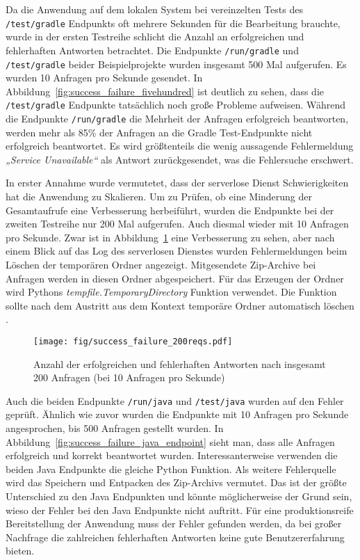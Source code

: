 Da die Anwendung auf dem lokalen System bei vereinzelten Tests des \texttt{/test/gradle} Endpunkts oft
mehrere Sekunden für die Bearbeitung brauchte, wurde in der ersten
Testreihe schlicht die Anzahl an erfolgreichen und fehlerhaften Antworten betrachtet.
Die Endpunkte \texttt{/run/gradle} und \texttt{/test/gradle} beider Beispielprojekte
wurden insgesamt 500 Mal aufgerufen. Es wurden 10 Anfragen pro Sekunde gesendet.
In Abbildung~\ref{fig:success_failure_fivehundred} ist deutlich zu sehen,
dass die \texttt{/test/gradle} Endpunkte tatsächlich noch große Probleme
aufweisen. Während die Endpunkte \texttt{/run/gradle} die Mehrheit der Anfragen erfolgreich
beantworten, werden mehr als 85\% der Anfragen an die Gradle Test-Endpunkte nicht
erfolgreich beantwortet. Es wird größtenteils die wenig aussagende Fehlermeldung \emph{„Service Unavailable“}
als Antwort zurückgesendet, was die Fehlersuche erschwert.

In erster Annahme wurde vermutetet, dass der serverlose Dienst Schwierigkeiten hat die
Anwendung zu Skalieren. Um zu Prüfen, ob eine Minderung der Gesamtaufrufe eine
Verbesserung herbeiführt, wurden die Endpunkte bei der zweiten Testreihe nur 200 Mal aufgerufen.
Auch diesmal wieder mit 10 Anfragen pro Sekunde.
Zwar ist in Abbildung~\ref{fig:success_failure_twohundred} eine Verbesserung zu sehen,
aber nach einem Blick auf das Log des serverlosen Dienstes wurden Fehlermeldungen beim Löschen
der temporären Ordner angezeigt. Mitgesendete Zip-Archive bei Anfragen werden
in diesen Ordner abgespeichert. Für das Erzeugen der Ordner wird
Pythons \emph{tempfile.TemporaryDirectory} Funktion verwendet.
Die Funktion sollte nach dem Austritt aus dem Kontext temporäre Ordner
automatisch löschen \cite{PythonTempfile}.

\begin{figure}
  \centering
  \texttt{[image: fig/success\_failure\_200reqs.pdf]}
  \caption{Anzahl der erfolgreichen und fehlerhaften Antworten nach insgesamt 200 Anfragen (bei 10 Anfragen pro Sekunde)}
  \label{fig:success_failure_twohundred}
\end{figure}

Auch die beiden Endpunkte \texttt{/run/java} und \texttt{/test/java} wurden auf den Fehler geprüft.
Ähnlich wie zuvor wurden die Endpunkte mit 10 Anfragen pro Sekunde angesprochen, bis
500 Anfragen gestellt wurden. In Abbildung~\ref{fig:success_failure_java_endpoint} sieht
man, dass alle Anfragen erfolgreich
und korrekt beantwortet wurden. Interessanterweise verwenden die beiden Java Endpunkte
die gleiche Python Funktion. Als weitere Fehlerquelle wird das Speichern
und Entpacken des Zip-Archivs vermutet. Das ist der größte Unterschied zu den Java Endpunkten und könnte
möglicherweise der Grund sein, wieso der Fehler bei den Java Endpunkte nicht auftritt.
Für eine produktionsreife Bereitstellung der Anwendung
muss der Fehler gefunden werden, da bei großer Nachfrage die zahlreichen fehlerhaften Antworten keine
gute Benutzererfahrung bieten.

